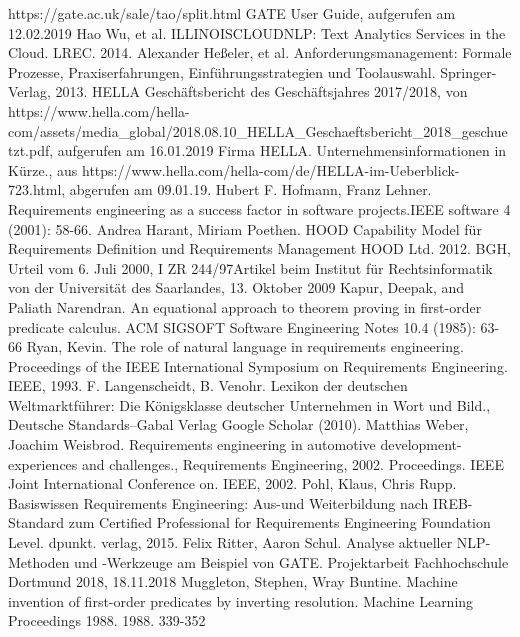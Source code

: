 \documentclass[12pt]{report}
\begin{document}
\begin{thebibliography}{20}
 https://gate.ac.uk/sale/tao/split.html GATE User Guide, aufgerufen am 12.02.2019
 Hao Wu, et al. \glqq  ILLINOISCLOUDNLP: Text Analytics Services in the Cloud.\grqq{}  LREC. 2014.
 Alexander Heßeler, et al. \glqq Anforderungsmanagement: Formale Prozesse, Praxiserfahrungen, Einführungsstrategien und Toolauswahl.\grqq{} Springer-Verlag, 2013.
 HELLA Geschäftsbericht des Geschäftsjahres 2017/2018, von https://www.hella.com/hella-com/assets/media\_global/2018.08.10\_HELLA\_Geschaeftsbericht\_2018\_geschuetzt.pdf, aufgerufen am 16.01.2019
Firma HELLA. \glqq Unternehmensinformationen in Kürze.\grqq , aus https://www.hella.com/hella-com/de/HELLA-im-Ueberblick-723.html, abgerufen am 09.01.19.
 Hubert F. Hofmann, Franz Lehner. \glqq Requirements engineering as a success factor in software projects.\grqq IEEE software 4 (2001): 58-66.
Andrea Harant, Miriam Poethen. \glqq HOOD Capability Model für Requirements Definition und Requirements Management \grqq{} HOOD Ltd. 2012.
BGH, \glqq Urteil vom 6. Juli 2000, I ZR 244/97\grqq Artikel beim Institut für Rechtsinformatik von der Universität des Saarlandes, 13. Oktober 2009
Kapur, Deepak, and Paliath Narendran. \glqq  An equational approach to theorem proving in first-order predicate calculus.\grqq{}  ACM SIGSOFT Software Engineering Notes 10.4 (1985): 63-66
Ryan, Kevin. \glqq The role of natural language in requirements engineering.\grqq{} Proceedings of the IEEE International Symposium on Requirements Engineering. IEEE, 1993.
F. Langenscheidt, B. Venohr. \glqq Lexikon der deutschen Weltmarktführer: Die Königsklasse deutscher Unternehmen in Wort und Bild.\grqq ,  Deutsche Standards–Gabal Verlag Google Scholar (2010).
Matthias Weber, Joachim Weisbrod. \glqq Requirements engineering in automotive development-experiences and challenges.\grqq , Requirements Engineering, 2002. Proceedings. IEEE Joint International Conference on. IEEE, 2002.
 Pohl, Klaus, Chris Rupp. \glqq Basiswissen Requirements Engineering: Aus-und Weiterbildung nach IREB-Standard zum Certified Professional for Requirements Engineering Foundation Level.\grqq{} dpunkt. verlag, 2015.
Felix Ritter, Aaron Schul. \glqq Analyse aktueller NLP-Methoden und -Werkzeuge am Beispiel von GATE.\grqq{} Projektarbeit Fachhochschule Dortmund 2018, 18.11.2018
Muggleton, Stephen, Wray Buntine. \glqq  Machine invention of first-order predicates by inverting resolution.\grqq{}  Machine Learning Proceedings 1988. 1988. 339-352

\end{thebibliography}
\end{document}
